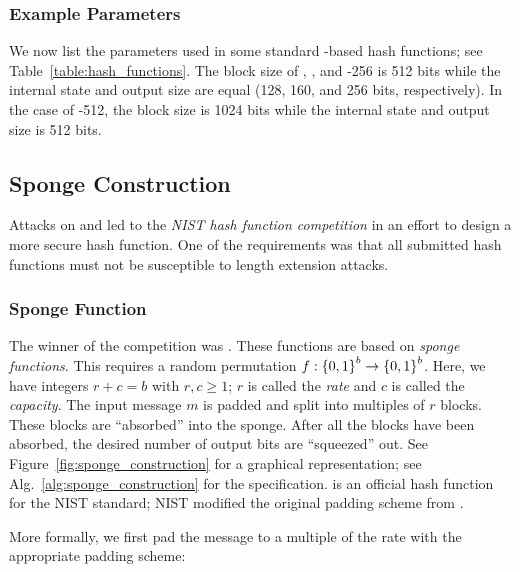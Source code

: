 \subsubsection{Example \MD{} Parameters}

We now list the parameters used in
some standard \MD{}-based \glspl{hash function};
see Table~\ref{table:hash_functions}.
The block size of \MDFive{}, \ShaOne{}, and \ShaTwo{}-256
is 512 bits while the internal state and output size
are equal (128, 160, and 256 bits, respectively).
In the case of \ShaTwo{}-512, the block size is 1024 bits
while the internal state and output size is 512 bits.




\subsection{Sponge Construction}
\label{app:crypto_sponge_construction}

Attacks on \MDFive{} and \ShaOne{} led to the
\emph{NIST hash function competition} in an effort to design
a more secure \gls{hash function}.
One of the requirements was that all submitted \glspl{hash function}
must not be susceptible to length extension attacks.

\subsubsection{Sponge Function}

The winner of the competition was \Keccak{}.
These functions are based on \emph{sponge functions}.
This requires a random \gls{permutation}
$f:\left\{ 0,1 \right\}^{b}\to\left\{ 0,1 \right\}^{b}$.
Here, we have integers $r + c = b$ with $r,c\ge1$;
$r$ is called the \emph{rate}
and $c$ is called the \emph{capacity}.
The input message $m$ is padded and split into multiples of $r$ blocks.
These blocks are ``absorbed'' into the sponge.
After all the blocks have been absorbed,
the desired number of output bits are ``squeezed'' out.
See Figure~\ref{fig:sponge_construction} for a graphical representation;
see Alg.~\ref{alg:sponge_construction} for the specification.
\ShaThree{} is an official \gls{hash function} for the NIST standard;
NIST modified the original padding scheme from \Keccak{}.




More formally, we first pad the message to a multiple of the rate
with the appropriate padding scheme:

